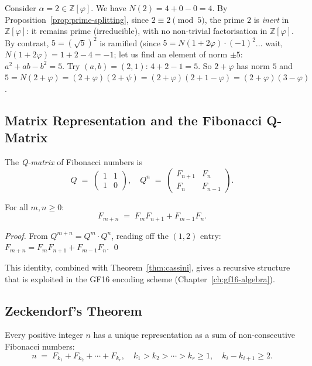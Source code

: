 \begin{example}
  Consider $\alpha = 2 \in \mathbb{Z}[\varphi]$.  We have
  $N(2) = 4 + 0 - 0 = 4$.  By Proposition~\ref{prop:prime-splitting},
  since $2 \equiv 2 \pmod 5$, the prime $2$ is \emph{inert} in
  $\mathbb{Z}[\varphi]$: it remains prime (irreducible), with no
  non-trivial factorisation in $\mathbb{Z}[\varphi]$.
  By contrast, $5 = (\sqrt{5})^2$ is ramified
  (since $5 = N(1 + 2\varphi) \cdot (-1)^2$... wait, $N(1+2\varphi) = 1+2-4=-1$;
  let us find an element of norm $\pm 5$: $a^2+ab-b^2 = 5$.
  Try $(a,b) = (2,1)$: $4+2-1 = 5$.  So $2+\varphi$ has norm $5$
  and $5 = N(2+\varphi) = (2+\varphi)(2+\psi) = (2+\varphi)(2+1-\varphi)
  = (2+\varphi)(3-\varphi)$.
\end{example}

\subsection{Matrix Representation and the Fibonacci Q-Matrix}

The \emph{Q-matrix} of Fibonacci numbers is
\[
  Q \;=\; \begin{pmatrix} 1 & 1 \\ 1 & 0 \end{pmatrix},
  \quad
  Q^n \;=\; \begin{pmatrix} F_{n+1} & F_n \\ F_n & F_{n-1} \end{pmatrix}.
\]

\begin{lemma}\label{lem:q-matrix}
  For all $m, n \geq 0$:
  \[
    F_{m+n} \;=\; F_m F_{n+1} + F_{m-1} F_n.
  \]
\end{lemma}

\begin{proof}
  From $Q^{m+n} = Q^m \cdot Q^n$, reading off the $(1,2)$ entry:
  $F_{m+n} = F_m F_{n+1} + F_{m-1} F_n$.  \qed
\end{proof}

This identity, combined with Theorem~\ref{thm:cassini}, gives a
recursive structure that is exploited in the GF16 encoding scheme
(Chapter~\ref{ch:gf16-algebra}).

\subsection{Zeckendorf's Theorem}

\begin{theorem}\label{thm:zeckendorf}
  Every positive integer $n$ has a unique representation as a sum
  of non-consecutive Fibonacci numbers:
  \[
    n \;=\; F_{k_1} + F_{k_2} + \cdots + F_{k_r},
    \quad k_1 > k_2 > \cdots > k_r \geq 1,
    \quad k_i - k_{i+1} \geq 2.
  \]
\end{theorem}

